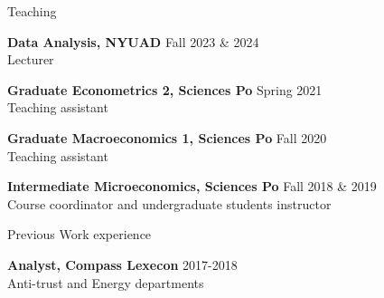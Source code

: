 \documentclass{resume} %
\begin{document}

\begin{rSection}{Teaching}

{\bf Data Analysis, NYUAD} \hfill {Fall 2023 \& 2024}
  \\ Lecturer

{\bf Graduate Econometrics 2, Sciences Po} \hfill {Spring 2021}
  \\ Teaching assistant

{\bf Graduate Macroeconomics 1, Sciences Po} \hfill {Fall 2020}
  \\ Teaching assistant


{\bf Intermediate Microeconomics, Sciences Po} \hfill {Fall 2018 \& 2019}
\\ Course coordinator and undergraduate students instructor

\end{rSection}


\begin{rSection}{Previous Work experience}


{\bf Analyst, Compass Lexecon} \hfill {2017-2018}
\\ Anti-trust and Energy departments


\end{rSection}

\end{document}
